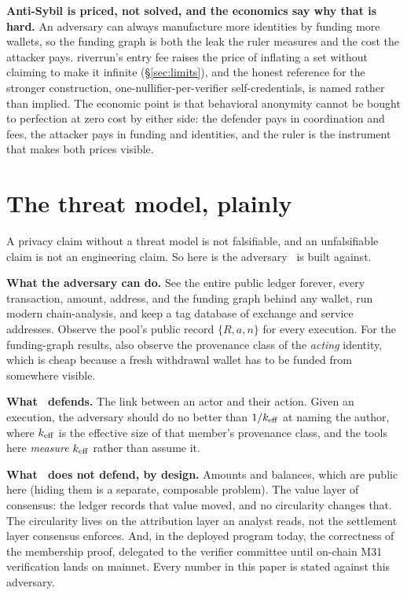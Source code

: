 \documentclass[11pt]{article}
\begin{document}
\textbf{Anti-Sybil is priced, not solved, and the economics say why that is hard.} An
adversary can always manufacture more identities by funding more wallets, so the funding
graph is both the leak the ruler measures and the cost the attacker pays. riverrun's entry
fee raises the price of inflating a set without claiming to make it infinite
(\S\ref{sec:limits}), and the honest reference for the stronger construction,
one-nullifier-per-verifier self-credentials, is named rather than implied. The economic
point is that behavioral anonymity cannot be bought to perfection at zero cost by either
side: the defender pays in coordination and fees, the attacker pays in funding and
identities, and the ruler is the instrument that makes both prices visible.

\section{The threat model, plainly}
\label{sec:threat}

A privacy claim without a threat model is not falsifiable, and an unfalsifiable claim is
not an engineering claim. So here is the adversary \river\ is built against.

\textbf{What the adversary can do.} See the entire public ledger forever, every
transaction, amount, address, and the funding graph behind any wallet, run modern
chain-analysis, and keep a tag database of exchange and service addresses. Observe the
pool's public record $\{R, a, n\}$ for every execution. For the funding-graph results,
also observe the provenance class of the \emph{acting} identity, which is cheap because a
fresh withdrawal wallet has to be funded from somewhere visible.

\textbf{What \river\ defends.} The link between an actor and their action. Given an
execution, the adversary should do no better than $1/k_{\mathrm{eff}}$ at naming the author, where
$k_{\mathrm{eff}}$ is the effective size of that member's provenance class, and the tools here
\emph{measure} $k_{\mathrm{eff}}$ rather than assume it.

\textbf{What \river\ does not defend, by design.} Amounts and balances, which are public
here (hiding them is a separate, composable problem). The value layer of consensus: the
ledger records that value moved, and no circularity changes that. The circularity lives
on the attribution layer an analyst reads, not the settlement layer consensus enforces.
And, in the deployed program today, the correctness of the membership proof, delegated to
the verifier committee until on-chain M31 verification lands on mainnet. Every number in
this paper is stated against this adversary.
\end{document}
